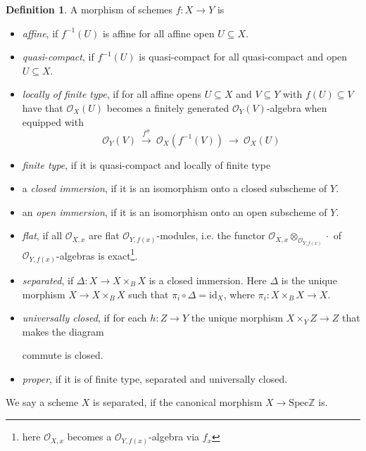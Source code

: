 \documentclass{scrartcl}
\newcommand{\Z}{\mathbb{Z}}
\newcommand{\Spec}{\mathrm{Spec}}
\renewcommand{\O}{\mathcal{O}}
\theoremstyle{definition}
\newtheorem{definition}[prop]{Definition}
\begin{document}
\begin{definition}
    A morphism of schemes $f: X \to Y$ is
    \begin{itemize}
        \item \emph{affine}, if $f^{-1}(U)$ is affine for all affine open $U \subseteq X$.
        \item \emph{quasi-compact}, if $f^{-1}(U)$ is quasi-compact for all quasi-compact and open $U \subseteq X$.
        \item \emph{locally of finite type}, if for all affine opens $U \subseteq X$ and $V \subseteq Y$ with $f(U) \subseteq V$ have that $\O_X(U)$ becomes a finitely generated $\O_Y(V)$-algebra when equipped with 
        \begin{equation*}
            \O_Y(V) \ \overset{f^\#}{\to} \ \O_X(f^{-1}(V)) \ \to \ \O_X(U)
        \end{equation*}
        \item \emph{finite type}, if it is quasi-compact and locally of finite type
        \item a \emph{closed immersion}, if it is an isomorphism onto a closed subscheme of $Y$.
        \item an \emph{open immersion}, if it is an isomorphism onto an open subscheme of $Y$.
        \item \emph{flat}, if all $\O_{X, x}$ are flat $\O_{Y, f(x)}$-modules, i.e. the functor $\O_{X, x} \otimes_{\O_{Y, f(x)}} \cdot$ of $\O_{Y, f(x)}$-algebras is exact\footnote{here $\O_{X, x}$ becomes a $\O_{Y, f(x)}$-algebra via $f_x$}.
        \item \emph{separated}, if $\Delta: X \to X \times_B X$ is a closed immersion.
        Here $\Delta$ is the unique morphism $X \to X \times_B X$ such that $\pi_i \circ \Delta = \mathrm{id}_X$, where $\pi_i: X \times_B X \to X$.
        \item \emph{universally closed}, if for each $h: Z \to Y$ the unique morphism $X \times_Y Z \to Z$ that makes the diagram
        \begin{center}
        \end{center}
        commute is closed.
        \item \emph{proper}, if it is of finite type, separated and universally closed.
    \end{itemize}
    We say a scheme $X$ is separated, if the canonical morphism $X \to \Spec \Z$ is.
\end{definition}
\end{document}
